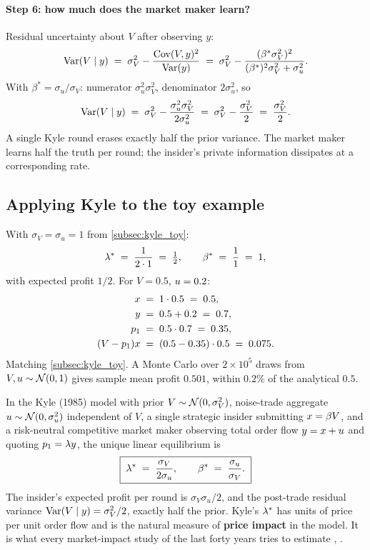 \paragraph{Step 6: how much does the market maker learn?}
Residual uncertainty about $V$ after observing $y$:
\[
  \operatorname{Var}(V \mid y)
  \;=\; \sigma_V^2 - \frac{\operatorname{Cov}(V, y)^2}{\operatorname{Var}(y)}
  \;=\; \sigma_V^2 - \frac{(\beta^\ast \sigma_V^2)^2}{(\beta^\ast)^2 \sigma_V^2 + \sigma_u^2}.
\]
With $\beta^\ast = \sigma_u/\sigma_V$: numerator $\sigma_u^2
\sigma_V^2$, denominator $2\sigma_u^2$, so
\[
  \operatorname{Var}(V \mid y)
  \;=\; \sigma_V^2 - \frac{\sigma_u^2 \sigma_V^2}{2\sigma_u^2}
  \;=\; \sigma_V^2 - \frac{\sigma_V^2}{2}
  \;=\; \frac{\sigma_V^2}{2}.
\]
A single Kyle round erases exactly half the prior variance. The
market maker learns half the truth per round; the insider's
private information dissipates at a corresponding rate.

\subsection{Applying Kyle to the toy example}
\label{subsec:kyle_apply_toy}

With $\sigma_V = \sigma_u = 1$ from \cref{subsec:kyle_toy}:
\[
  \lambda^\ast \;=\; \frac{1}{2 \cdot 1} \;=\; \tfrac{1}{2},
  \qquad
  \beta^\ast \;=\; \frac{1}{1} \;=\; 1,
\]
with expected profit $1/2$. For $V = 0.5$, $u = 0.2$:
\begin{align*}
  x \;&=\; 1 \cdot 0.5 \;=\; 0.5, \\
  y \;&=\; 0.5 + 0.2 \;=\; 0.7, \\
  p_1 \;&=\; 0.5 \cdot 0.7 \;=\; 0.35, \\
  (V - p_1) x \;&=\; (0.5 - 0.35) \cdot 0.5 \;=\; 0.075.
\end{align*}
Matching \cref{subsec:kyle_toy}. A Monte Carlo over $2 \times 10^5$
draws from $V, u \sim \mathcal{N}(0, 1)$ gives sample mean profit
$0.501$, within $0.2\%$ of the analytical $0.5$.

\begin{keyfactbox}
In the Kyle (1985) model \citeKyle{} with prior $V \sim
\mathcal{N}(0, \sigma_V^2)$, noise-trade aggregate $u \sim
\mathcal{N}(0, \sigma_u^2)$ independent of $V$, a single strategic
insider submitting $x = \beta V$, and a risk-neutral
competitive market maker observing total order flow $y =
x + u$ and quoting $p_1 = \lambda y$, the unique linear
equilibrium is
\[
  \boxed{\;\lambda^\ast \;=\; \frac{\sigma_V}{2\sigma_u},
  \qquad
  \beta^\ast \;=\; \frac{\sigma_u}{\sigma_V}.\;}
\]
The insider's expected profit per round is $\sigma_V \sigma_u / 2$,
and the post-trade residual variance $\operatorname{Var}(V \mid y) = \sigma_V^2
/ 2$, exactly half the prior. Kyle's $\lambda^\ast$ has units of
price per unit order flow and is the natural measure of
\textbf{price impact} in the model. It is what every market-impact
study of the last forty years tries to estimate
\citeHasbrouck{}, \citeBouchaud{}.
\end{keyfactbox}

